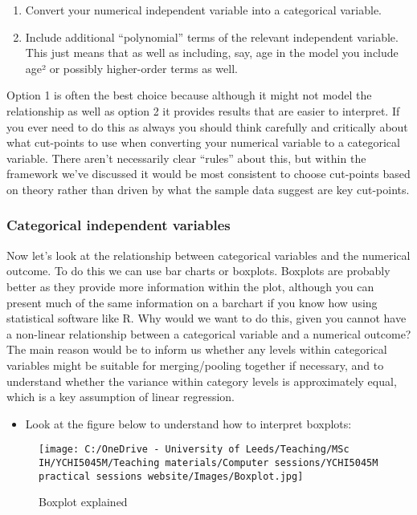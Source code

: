 \documentclass[
]{book}
\providecommand{\tightlist}{%
  \setlength{\itemsep}{0pt}\setlength{\parskip}{0pt}}
\begin{document}
\begin{enumerate}
\def\labelenumi{\arabic{enumi}.}
\item
  Convert your numerical independent variable into a categorical variable.
\item
  Include additional ``polynomial'' terms of the relevant independent variable. This just means that as well as including, say, age in the model you include age² or possibly higher-order terms as well.
\end{enumerate}

Option 1 is often the best choice because although it might not model the relationship as well as option 2 it provides results that are easier to interpret. If you ever need to do this as always you should think carefully and critically about what cut-points to use when converting your numerical variable to a categorical variable. There aren't necessarily clear ``rules'' about this, but within the framework we've discussed it would be most consistent to choose cut-points based on theory rather than driven by what the sample data suggest are key cut-points.

\hypertarget{categorical-independent-variables}{%
\subsubsection{Categorical independent variables}\label{categorical-independent-variables}}

Now let's look at the relationship between categorical variables and the numerical outcome. To do this we can use bar charts or boxplots. Boxplots are probably better as they provide more information within the plot, although you can present much of the same information on a barchart if you know how using statistical software like R. Why would we want to do this, given you cannot have a non-linear relationship between a categorical variable and a numerical outcome? The main reason would be to inform us whether any levels within categorical variables might be suitable for merging/pooling together if necessary, and to understand whether the variance within category levels is approximately equal, which is a key assumption of linear regression.

\begin{itemize}
\tightlist
\item
  Look at the figure below to understand how to interpret boxplots:
\end{itemize}

\begin{figure}
\centering
\texttt{[image: C:/OneDrive - University of Leeds/Teaching/MSc IH/YCHI5045M/Teaching materials/Computer sessions/YCHI5045M practical sessions website/Images/Boxplot.jpg]}
\caption{Boxplot explained}
\end{figure}
\end{document}
